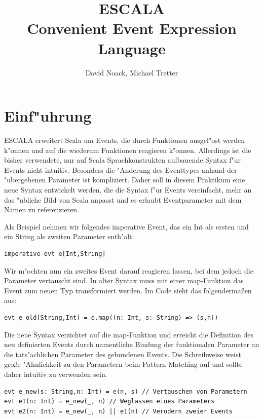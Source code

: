 \documentclass[a4paper,11pt,parskip=half]{scrartcl}
\begin{document}
\title{ESCALA \\ Convenient Event Expression Language}
\author{David Noack, Michael Tretter}

\maketitle

\section{Einf"uhrung}

ESCALA erweitert Scala um Events, die durch Funktionen ausgel"ost werden k"onnen und auf die wiederum Funktionen reagieren k"onnen.
Allerdings ist die bisher verwendete, nur auf Scala Sprachkonstrukten aufbauende Syntax f"ur Events nicht intuitiv.
Besonders die "Anderung des Eventtypes anhand der "ubergebenen Parameter ist kompliziert.
Daher soll in diesem Praktikum eine neue Syntax entwickelt werden, die die Syntax f"ur Events vereinfacht, mehr an das "ubliche Bild von Scala anpasst und es erlaubt Eventparameter mit dem Namen zu referenzieren.

Als Beispiel nehmen wir folgendes imperative Event, das ein Int als ersten und ein String als zweiten Parameter enth"alt:
\begin{lstlisting}
imperative evt e[Int,String]
\end{lstlisting}

Wir m"ochten nun ein zweites Event darauf reagieren lassen, bei dem jedoch die Parameter vertauscht sind. 
In alter Syntax muss mit einer map-Funktion das Event zum neuen Typ transformiert werden.
Im Code sieht das folgenderma{\ss}en aus:
\begin{lstlisting}
evt e_old[String,Int] = e.map((n: Int, s: String) => (s,n))
\end{lstlisting}

Die neue Syntax verzichtet auf die map-Funktion und erreicht die Definition des neu definierten Events durch namentliche Bindung der funktionalen Parameter an die tats"achlichen Parameter des gebundenen Events.
Die Schreibweise weist gro{\ss}e "Ahnlichkeit zu den Parametern beim Pattern Matching auf und sollte daher intuitiv zu verwenden sein.
\begin{lstlisting}
evt e_new(s: String,n: Int) = e(n, s) // Vertauschen von Parametern
evt e1(n: Int) = e_new(_, n) // Weglassen eines Parameters
evt e2(n: Int) = e_new(_, n) || e1(n) // Verodern zweier Events
\end{lstlisting}
\end{document}
